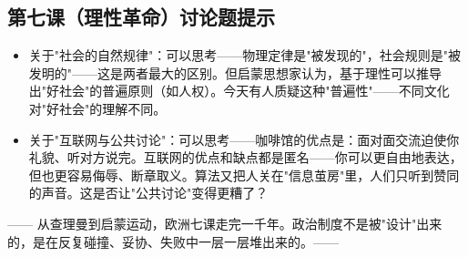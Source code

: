 \documentclass[a4paper,12pt]{ctexart}
\begin{document}
\subsection*{第七课（理性革命）讨论题提示}
\begin{itemize}
  \item 关于"社会的自然规律"：可以思考——物理定律是"被发现的"，社会规则是"被发明的"——这是两者最大的区别。但启蒙思想家认为，基于理性可以推导出"好社会"的普遍原则（如人权）。今天有人质疑这种"普遍性"——不同文化对"好社会"的理解不同。
  \item 关于"互联网与公共讨论"：可以思考——咖啡馆的优点是：面对面交流迫使你礼貌、听对方说完。互联网的优点和缺点都是匿名——你可以更自由地表达，但也更容易侮辱、断章取义。算法又把人关在"信息茧房"里，人们只听到赞同的声音。这是否让"公共讨论"变得更糟了？
\end{itemize}

\vspace{0.5cm}
\begin{center}
\textcolor{blue!70!black}{\large —— 从查理曼到启蒙运动，欧洲七课走完一千年。政治制度不是被"设计"出来的，是在反复碰撞、妥协、失败中一层一层堆出来的。——}
\end{center}
\end{document}
